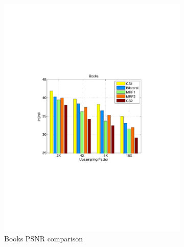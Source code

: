 \documentclass[preprint,10pt,5p,times,twocolumn]{elsarticle}
\begin{document}
\begin{figure}
\centering
\begin{subfigure}[b]{0.24\textwidth}
\includegraphics[width=\textwidth]{fig_exp1_books_noise.pdf}
\caption*{Books PSNR comparison}
\end{subfigure}
\begin{subfigure}[b]{0.24\textwidth}

\end{subfigure}
\end{figure}
\end{document}
